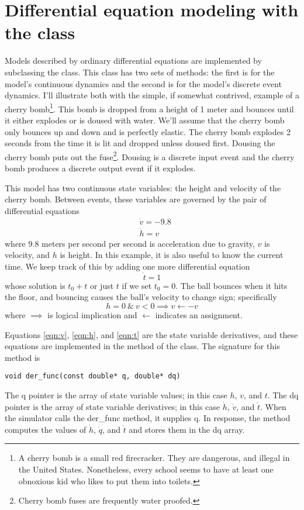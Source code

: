 \section{Differential equation modeling with the  class}
Models described by ordinary differential equations are implemented by subclassing the  class. This class has two sets of methods: the first is for the model's continuous dynamics and the second is for the model's discrete event dynamics. I'll illustrate both with the simple, if somewhat contrived, example of a cherry bomb\footnote{A cherry bomb is a small red firecracker. They are dangerous, and illegal in the United States. Nonetheless, every school seems to have at least one obnoxious kid who likes to put them into toilets.}. This bomb is dropped from a height of 1 meter and bounces until it either explodes or is doused with water. We'll assume that the cherry bomb only bounces up and down and is perfectly elastic. The cherry bomb explodes 2 seconds from the time it is lit and dropped unless doused first. Dousing the cherry bomb puts out the fuse\footnote{Cherry bomb fuses are frequently water proofed.}. Dousing is a discrete input event and the cherry bomb produces a discrete output event if it explodes. 

This model has two continuous state variables: the height and velocity of the cherry bomb. Between events, these variables are governed by the pair of differential equations
\begin{align}
&\dot{v} = -9.8 \label{eqn:v} \\
&\dot{h} = v \label{eqn:h}
\end{align}
where $9.8$ meters per second per second is acceleration due to gravity, $v$ is velocity, and $h$ is height. In this example, it is also useful to know the current time. We keep track of this by adding one more differential equation
\begin{equation}
\dot{t} = 1 \label{eqn:t}
\end{equation}
whose solution is $t_0 + t$ or just $t$ if we set $t_0 = 0$. The ball bounces when it hits the floor, and bouncing causes the ball's velocity to change sign; specifically
\begin{equation}
h = 0 \ \& \ v < 0 \implies v \leftarrow -v \label{eqn:state_event}
\end{equation}
where $\implies$ is logical implication and $\leftarrow$ indicates an assignment. 

Equations \ref{eqn:v}, \ref{eqn:h}, and \ref{eqn:t} are the state variable derivatives, and these equations are implemented in the  method of the  class. The signature for this method is
\begin{verbatim}
void der_func(const double* q, double* dq)
\end{verbatim}
The q pointer is the array of state variable values; in this case $h$, $v$, and $t$. The dq pointer is the array of state variable derivatives; in this case $\dot{h}$, $\dot{v}$, and $\dot{t}$. When the simulator calls the der\_func method, it supplies q. In response, the method computes the values of $\dot{h}$, $\dot{q}$, and $\dot{t}$ and stores them in the dq array.

